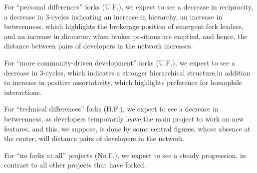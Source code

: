 \documentclass{acm_proc_article-sp}
\begin{document}
For ``personal differences'' forks (U.F.), we expect to see a decrease in reciprocity, a decrease in 3-cycles indicating an increase in hierarchy, an increase in betweenness, which highlights the brokerage position of emergent fork leaders, and an increase in diameter, when broker positions are emptied, and hence, the distance between pairs of developers in the network increases. 

For ``more community-driven development'' forks (U.F.), we expect to see a decrease in 3-cycles, which indicates a stronger hierarchical structure,in addition to increase in positive assortativity, which highlights preference for homophile interactions.

For  ``technical differences'' forks (H.F.), we expect to see a decrease in betweenness, as developers temporarily leave the main project to work on new features, and this, we suppose, is done by some central figures, whose absence at the center, will distance pairs of developers in the network.

For ``no forks at all'' projects (No.F.), we expect to see a steady progression, in contrast to all other projects that have forked.
\end{document}
